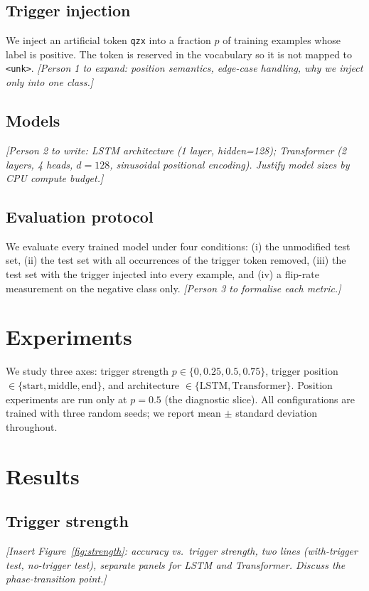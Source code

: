 \documentclass[10pt,a4paper]{article}
\begin{document}
\subsection{Trigger injection}
We inject an artificial token \texttt{qzx} into a fraction $p$ of training
examples whose label is positive. The token is reserved in the vocabulary so
it is not mapped to \texttt{<unk>}. \textit{[Person 1 to expand: position
semantics, edge-case handling, why we inject only into one class.]}

\subsection{Models}
\textit{[Person 2 to write: LSTM architecture (1 layer, hidden=128); Transformer
(2 layers, 4 heads, $d=128$, sinusoidal positional encoding). Justify model
sizes by CPU compute budget.]}

\subsection{Evaluation protocol}
We evaluate every trained model under four conditions: (i) the unmodified test
set, (ii) the test set with all occurrences of the trigger token removed,
(iii) the test set with the trigger injected into every example, and (iv) a
flip-rate measurement on the negative class only. \textit{[Person 3 to
formalise each metric.]}

\section{Experiments}
\label{sec:experiments}

We study three axes: trigger strength $p \in \{0, 0.25, 0.5, 0.75\}$, trigger
position $\in \{\text{start}, \text{middle}, \text{end}\}$, and architecture
$\in \{\text{LSTM}, \text{Transformer}\}$. Position experiments are run only
at $p=0.5$ (the diagnostic slice). All configurations are trained with three
random seeds; we report mean $\pm$ standard deviation throughout.

\section{Results}
\label{sec:results}

\subsection{Trigger strength}
\textit{[Insert Figure~\ref{fig:strength}: accuracy vs.\ trigger strength,
two lines (with-trigger test, no-trigger test), separate panels for LSTM
and Transformer. Discuss the phase-transition point.]}
\end{document}

